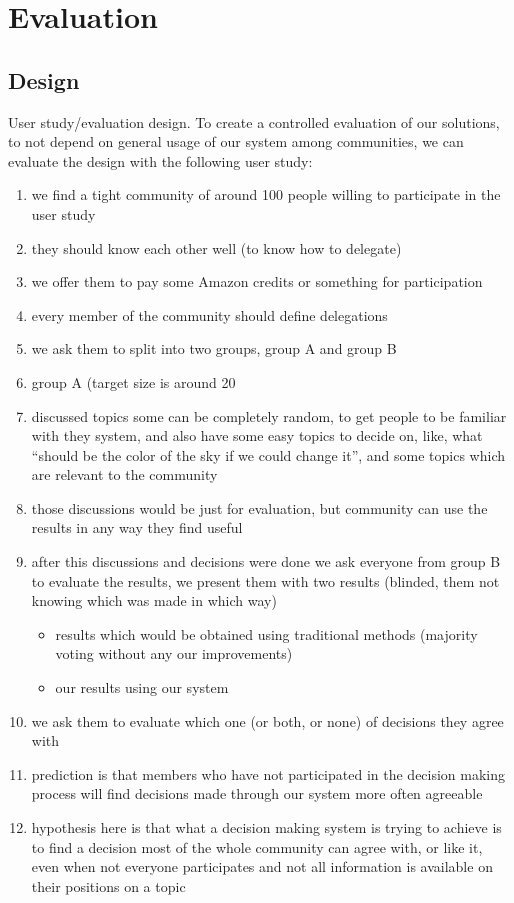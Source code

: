 \documentclass{sigchi}
\begin{document}
\section{Evaluation}

\subsection{Design}

User study/evaluation design.
To create a controlled evaluation of our solutions, to not depend on general usage of our system among communities,
we can evaluate the design with the following user study:
\begin{enumerate}
\item we find a tight community of around 100 people willing to participate in the user study
\item they should know each other well (to know how to delegate)
\item we offer them to pay some Amazon credits or something for participation
\item every member of the community should define delegations
\item we ask them to split into two groups, group A and group B
\item group A (target size is around 20%
\item discussed topics some can be completely random, to get people to be familiar with they system, and also have some
easy topics to decide on, like, what ``should be the color of the sky if we could change it'', and some topics which are relevant to the community
\item those discussions would be just for evaluation, but community can use the results in any way they find useful
\item after this discussions and decisions were done we ask everyone from group B to evaluate the results, we present them with two results (blinded, them not knowing which was made in which way)
\begin{itemize}
\item results which would be obtained using traditional methods (majority voting without any our improvements)
\item our results using our system
\end{itemize}
\item we ask them to evaluate which one (or both, or none) of decisions they agree with
\item prediction is that members who have not participated in the decision making process will
find decisions made through our system more often agreeable
\item hypothesis here is that what a decision making system is trying to achieve is to find a decision most of the
whole community can agree with, or like it, even when not everyone participates and not all information is available
on their positions on a topic
\end{enumerate}
\end{document}
